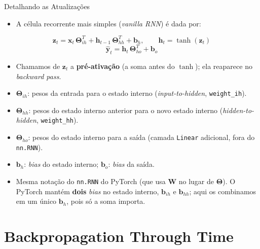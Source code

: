 \documentclass[aspectratio=169,xcolor=dvipsnames]{beamer}
\begin{document}
\begin{frame}{Detalhando as Atualizações}
\begin{itemize}
    \item A célula recorrente mais simples (\textit{vanilla RNN}) é dada por:
\end{itemize}
\vspace{0.3em}
\begin{equation*}
    \mathbf{z}_t = \mathbf{x}_t\,\mathbf{\Theta}_{ih}^{T} + \mathbf{h}_{t-1}\,\mathbf{\Theta}_{hh}^{T} + \mathbf{b}_h, \qquad \mathbf{h}_t = \tanh(\mathbf{z}_t)
\end{equation*}
\begin{equation*}
    \hat{\mathbf{y}}_t = \mathbf{h}_t\,\mathbf{\Theta}_{ho}^{T} + \mathbf{b}_o
\end{equation*}
\begin{itemize}\footnotesize
    \item Chamamos de $\mathbf{z}_t$ a \textbf{pré-ativação} (a soma antes do $\tanh$); ela reaparece no \textit{backward pass}.
\end{itemize}
\begin{itemize}
    \item $\mathbf{\Theta}_{ih}$: pesos da entrada para o estado interno (\textit{input-to-hidden}, \texttt{weight\_ih}).
    \item $\mathbf{\Theta}_{hh}$: pesos do estado interno anterior para o novo estado interno (\textit{hidden-to-hidden}, \texttt{weight\_hh}).
    \item $\mathbf{\Theta}_{ho}$: pesos do estado interno para a saída (camada \texttt{Linear} adicional, fora do \texttt{nn.RNN}).
    \item $\mathbf{b}_h$: \textit{bias} do estado interno; \quad $\mathbf{b}_o$: \textit{bias} da saída.
\end{itemize}
\vspace{0.3em}
\begin{itemize}\footnotesize
    \item Mesma notação do \texttt{nn.RNN} do PyTorch (que usa $\mathbf{W}$ no lugar de $\mathbf{\Theta}$). O PyTorch mantém \textbf{dois} \textit{bias} no estado interno, $\mathbf{b}_{ih}$ e $\mathbf{b}_{hh}$; aqui os combinamos em um único $\mathbf{b}_h$, pois só a soma importa.
\end{itemize}
\end{frame}

\section{Backpropagation Through Time}
\end{document}
